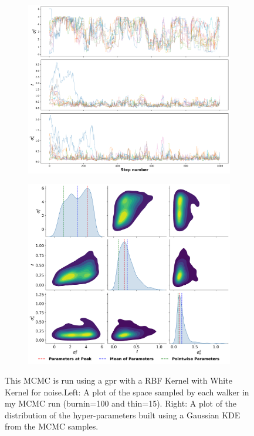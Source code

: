 \documentclass{article}
\begin{document}
\begin{figure}[H]
    \centering
    \begin{subfigure}[b]{0.48\textwidth}
        \centering
        \includegraphics[width=\textwidth]{LatexPlots/1dplots/MCMCwalkers.png}
    \end{subfigure}
    \hfill
    \begin{subfigure}[b]{0.48\textwidth}
        \centering
        \includegraphics[width=\textwidth]{LatexPlots/1dplots/MCMCdistribution.png}
    \end{subfigure}
    \caption{This MCMC is run using a gpr with a RBF Kernel with White Kernel for noise.Left: A plot of the space sampled by each walker in my MCMC run (burnin=100 and thin=15). \quad Right: A plot of the distribution of the hyper-parameters built using a Gaussian KDE from the MCMC samples.}
    \label{fig:MCMCresults}
\end{figure}
\end{document}
